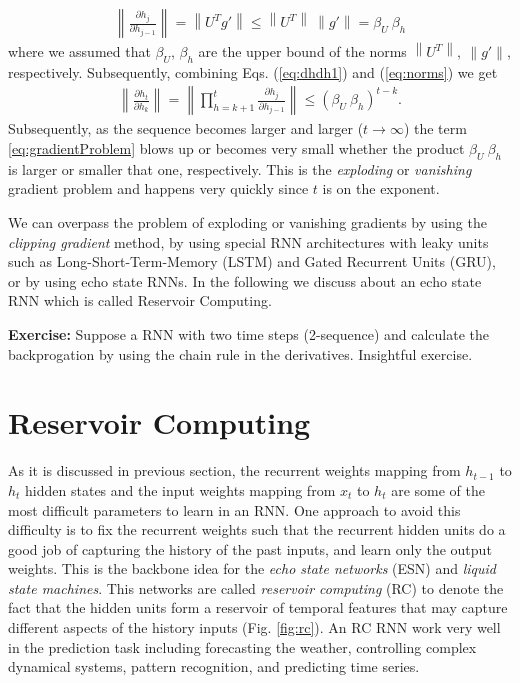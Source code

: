 \documentclass[12pt,letterpaper]{article}
\newcommand\norm[1]{\left\lVert#1\right\rVert}
\begin{document}
\begin{align}
\label{eq:norms}
\norm{\frac{\partial h_j}{\partial h_{j-1} }} = \norm{ U^T g'} \le \norm{U^T}\ \norm{g'} = \beta_U\ \beta_h
\end{align}
where we assumed that $\beta_U$, $\beta_h$ are the upper bound of the norms $\norm{U^T},\ \norm{g'}$, respectively. Subsequently, combining Eqs. (\ref{eq:dhdh1}) and (\ref{eq:norms}) we get
\begin{align}
\label{eq:gradientProblem}
\norm{ \frac{\partial h_t}{\partial h_k} } = \norm{ \prod_{h=k+1}^t \frac{\partial h_j}{\partial h_{j-1} } }  \le \left( \beta_U\ \beta_h \right)^{t-k} . 
\end{align}
Subsequently, as the sequence becomes larger and larger ($t\rightarrow \infty$) the term \ref{eq:gradientProblem} blows up or becomes very small whether the product  $ \beta_U\ \beta_h$ is larger or smaller that one, respectively. This is the \emph{exploding} or \emph{vanishing} gradient problem and happens very quickly since $t$ is on the exponent.

We can overpass the problem of exploding or vanishing gradients by using the \emph{clipping gradient} method, by using special RNN architectures  with leaky units such as Long-Short-Term-Memory (LSTM) and Gated Recurrent Units (GRU), or by using echo state RNNs. In the following we discuss about an echo state RNN which is called Reservoir Computing.


{\bf Exercise:} Suppose a RNN with two time steps  (2-sequence) and calculate the backprogation by using the chain rule in the derivatives. Insightful exercise.

\section{Reservoir Computing}

As it is discussed in previous section, the recurrent weights mapping from $h_{t-1}$ to $h_t$ hidden states  and the input weights mapping from $x_t$ to $h_t$ are some of the most difficult parameters to learn in an RNN. One approach to avoid this difficulty is to fix the recurrent weights such that the recurrent hidden units do a good job of capturing the history of the past inputs, and learn only the output weights. This is the backbone idea for the \emph{echo state networks} (ESN) and \emph{liquid state machines}. This networks are called \emph{reservoir computing} (RC) to denote the fact that the hidden units form a reservoir of temporal features that may capture different aspects of the history inputs (Fig. \ref{fig:rc}). An RC RNN work very well in the prediction task including forecasting the weather, controlling complex dynamical systems, pattern recognition, and predicting time series.
\end{document}
